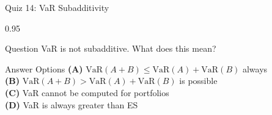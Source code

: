 \documentclass[9pt, aspectratio=169, t]{beamer}
\begin{document}
\begin{frame}{Quiz 14: VaR Subadditivity}
\begin{cminipage}{0.95\textwidth}
    \begin{alertblock}{Question}
        VaR is not subadditive. What does this mean?
    \end{alertblock}

    \vspace{0.5cm}
    \begin{block}{Answer Options}
    \textcolor{MainBlue}{\textbf{(A)}} $\text{VaR}(A+B) \leq \text{VaR}(A) + \text{VaR}(B)$ always\\[3pt]
    \textcolor{MainBlue}{\textbf{(B)}} $\text{VaR}(A+B) > \text{VaR}(A) + \text{VaR}(B)$ is possible\\[3pt]
    \textcolor{MainBlue}{\textbf{(C)}} VaR cannot be computed for portfolios\\[3pt]
    \textcolor{MainBlue}{\textbf{(D)}} VaR is always greater than ES
    \end{block}
\end{cminipage}
\end{frame}
\end{document}
